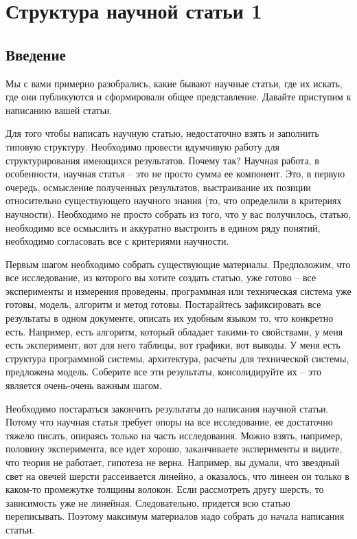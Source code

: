 \documentclass{report}
\begin{document}
\chapter{Структура научной статьи 1}

\section{Введение}
Мы с вами примерно разобрались, какие бывают научные статьи, где их искать, где они публикуются и сформировали общее представление. Давайте приступим к написанию вашей статьи.

Для того чтобы написать научную статью, недостаточно взять и заполнить типовую структуру. Необходимо провести вдумчивую работу для структурирования имеющихся результатов. Почему так? Научная работа, в особенности, научная статья – это не просто сумма ее компонент. Это, в первую очередь, осмысление полученных результатов, выстраивание их позиции относительно существующего научного знания (то, что определили в критериях научности). Необходимо не просто собрать из того, что у вас получилось, статью, необходимо все осмыслить и аккуратно выстроить в едином ряду понятий, необходимо согласовать все с критериями научности.

Первым шагом необходимо собрать существующие материалы. Предположим, что все исследование, из которого вы хотите создать статью, уже готово – все эксперименты и измерения проведены, программная или техническая система уже готовы, модель, алгоритм и метод готовы. Постарайтесь зафиксировать все результаты в одном документе, описать их удобным языком то, что конкретно есть. Например, есть алгоритм, который обладает такими-то свойствами, у меня есть эксперимент, вот для него таблицы, вот графики, вот выводы. У меня есть структура программной системы, архитектура, расчеты для технической системы, предложена модель. Соберите все эти результаты, консолидируйте их – это является очень-очень важным шагом.

Необходимо постараться закончить результаты до написания научной статьи. Потому что научная статья требует опоры на все исследование, ее достаточно тяжело писать, опираясь только на часть исследования. Можно взять, например, половину эксперимента, все идет хорошо, заканчиваете эксперименты и видите, что теория не работает, гипотеза не верна. Например, вы думали, что звездный свет на овечей шерсти рассеивается линейно, а оказалось, что линеен он только в каком-то промежутке толщины волокон. Если рассмотреть другу шерсть, то зависимость уже не линейная. Следовательно, придется всю статью переписывать. Поэтому максимум материалов надо собрать до начала написания статьи.
\end{document}
